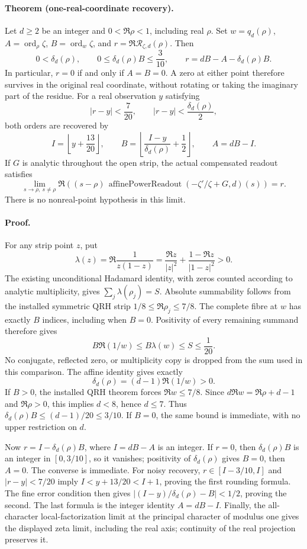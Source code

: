 \paragraph{Theorem (one-real-coordinate recovery).}
Let \(d\ge2\) be an integer and \(0<\Re\rho<1\), including real \(\rho\).
Set \(w=q_d(\rho)\), \(A=\operatorname{ord}_{\rho}\zeta\),
\(B=\operatorname{ord}_{w}\zeta\), and
\(r=\Re\mathcal R_{\zeta,d}(\rho)\). Then
\[
 0<\delta_d(\rho),\qquad 0\le\delta_d(\rho)B\le\frac3{10},\qquad
 r=dB-A-\delta_d(\rho)B.
\]
In particular, \(r=0\) if and only if \(A=B=0\). A zero at either
point therefore survives in the original real coordinate, without rotating
or taking the imaginary part of the residue. For a real observation \(y\)
satisfying
\[
 |r-y|<\frac7{20},\qquad |r-y|<\frac{\delta_d(\rho)}2,
\]
both orders are recovered by
\[
 I=\left\lfloor y+\frac{13}{20}\right\rfloor,\qquad
 B=\left\lfloor\frac{I-y}{\delta_d(\rho)}+\frac12\right\rfloor,
 \qquad A=dB-I.
\]
If \(G\) is analytic throughout the open strip, the actual compensated
readout satisfies
\[
 \lim_{s\to\rho,\ s\ne\rho}
 \Re\!\left((s-\rho)\,
 \operatorname{affinePowerReadout}
 (-\zeta'/\zeta+G,d)(s)\right)=r.
\]
There is no nonreal-point hypothesis in this limit.

\paragraph{Proof.}
For any strip point \(z\), put
\[
 \lambda(z)=\Re\frac1{z(1-z)}
 =\frac{\Re z}{|z|^2}+\frac{1-\Re z}{|1-z|^2}>0.
\]
The existing unconditional Hadamard identity, with zeros counted according
to analytic multiplicity, gives
\(\sum_j\lambda(\rho_j)=S\). Absolute summability follows from the
installed symmetric QRH strip \(1/8\le\Re\rho_j\le7/8\).
The complete fibre at \(w\) has exactly \(B\) indices, including when
\(B=0\). Positivity of every remaining summand therefore gives
\[
 B\Re(1/w)\le B\lambda(w)\le S\le\frac1{20}.
\]
No conjugate, reflected zero, or multiplicity copy is dropped from the
sum used in this comparison. The affine identity gives exactly
\[
 \delta_d(\rho)=(d-1)\Re(1/w)>0.
\]
If \(B>0\), the installed QRH theorem forces \(\Re w\le7/8\).
Since \(d\Re w=\Re\rho+d-1\) and \(\Re\rho>0\), this implies
\(d<8\), hence \(d\le7\). Thus
\(\delta_d(\rho)B\le(d-1)/20\le3/10\). If \(B=0\), the same
bound is immediate, with no upper restriction on \(d\).

Now \(r=I-\delta_d(\rho)B\), where \(I=dB-A\) is an integer.
If \(r=0\), then \(\delta_d(\rho)B\) is an integer in
\([0,3/10]\), so it vanishes; positivity of \(\delta_d(\rho)\)
gives \(B=0\), then \(A=0\). The converse is immediate.
For noisy recovery, \(r\in[I-3/10,I]\) and \(|r-y|<7/20\)
imply \(I<y+13/20<I+1\), proving the first rounding formula.
The fine error condition then gives
\(\left|(I-y)/\delta_d(\rho)-B\right|<1/2\), proving the second.
The last formula is the integer identity \(A=dB-I\).
Finally, the all-character local-factorization limit at the principal
character of modulus one gives the displayed zeta limit, including the
real axis; continuity of the real projection preserves it.


